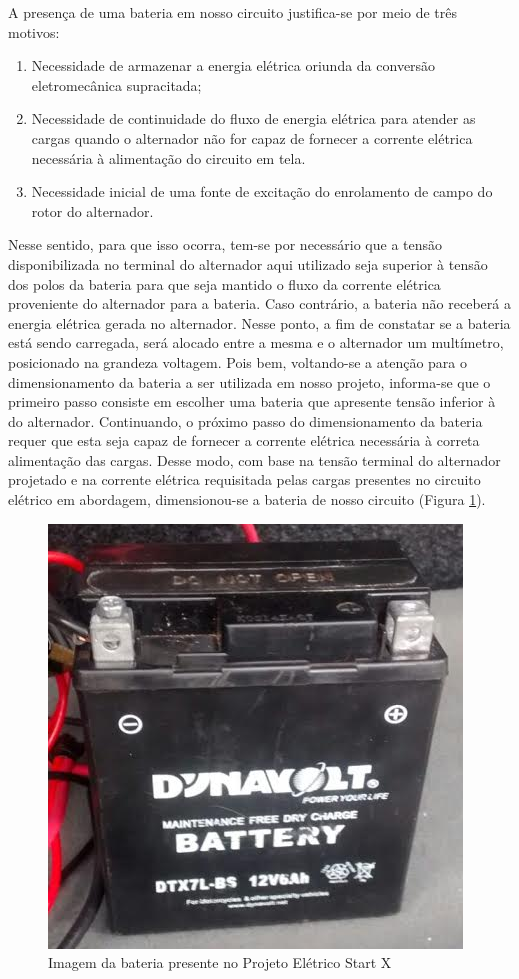 A presença de uma bateria em nosso circuito justifica-se por meio de três motivos:

\begin{enumerate}
	\item Necessidade de armazenar a energia elétrica oriunda da conversão eletromecânica supracitada;
	\item Necessidade de continuidade do fluxo de energia elétrica para atender as cargas quando o alternador não for capaz de fornecer a corrente elétrica necessária à alimentação do circuito em tela.
	\item Necessidade inicial de uma fonte de excitação do enrolamento de campo do rotor do alternador.
\end{enumerate}

Nesse sentido, para que isso ocorra, tem-se por necessário que a tensão disponibilizada no terminal do alternador aqui utilizado seja superior à tensão dos polos da bateria para que seja mantido o fluxo da corrente elétrica proveniente do alternador para a bateria. Caso contrário, a bateria não receberá a energia elétrica gerada no alternador. Nesse ponto, a fim de constatar se a bateria está sendo carregada, será alocado entre a mesma e o alternador um multímetro, posicionado na grandeza voltagem. 
Pois bem, voltando-se a atenção para o dimensionamento da bateria a ser utilizada em nosso projeto, informa-se que o primeiro passo consiste em escolher uma bateria que apresente tensão inferior à do alternador. Continuando, o próximo passo do dimensionamento da bateria requer que esta seja capaz de fornecer a corrente elétrica necessária à correta alimentação das cargas. 
Desse modo, com base na tensão terminal do alternador projetado e na corrente elétrica requisitada pelas cargas presentes no circuito elétrico em abordagem, dimensionou-se a bateria de nosso circuito (Figura \ref{bateria}). 

\begin{figure}[h]
	\centering
	\includegraphics[scale=0.6]		{figuras/bateria.png}
	\caption{Imagem da bateria presente no Projeto Elétrico Start X}
	\label{bateria}
\end{figure}

